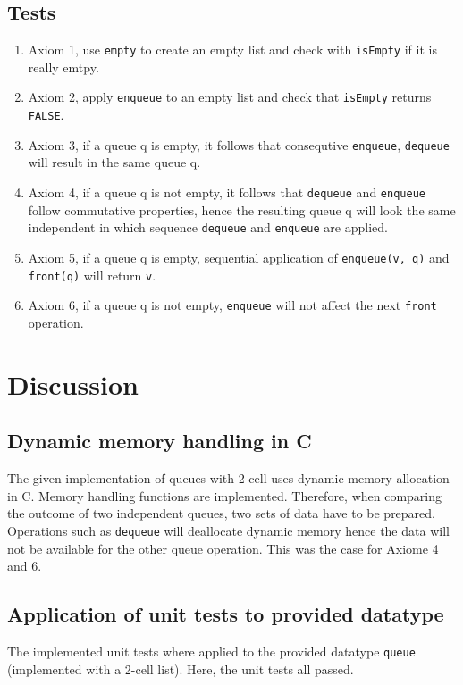 \documentclass[a4paper,11pt,twoside]{article}
\begin{document}
\subsection{Tests}
\begin{enumerate}
  \item Axiom 1, use \texttt{empty} to create an empty list and check
    with \texttt{isEmpty} if it is really emtpy. 
    \item Axiom 2, apply \texttt{enqueue} to an empty list and check
      that \texttt{isEmpty} returns \texttt{FALSE}.
      \item Axiom 3, if a queue q is empty, it follows that 
        consequtive \texttt{enqueue}, \texttt{dequeue} will result in
        the same queue q. 
        \item Axiom 4, if a queue q is not empty, it follows that
          \texttt{dequeue} and \texttt{enqueue} follow commutative
          properties, hence the resulting queue q will look the same
          independent in which sequence \texttt{dequeue} and 
          \texttt{enqueue} are applied.
          \item Axiom 5, if a queue q is empty, sequential
            application of \texttt{enqueue(v, q)} and
            \texttt{front(q)} will return \texttt{v}.
            \item Axiom 6, if a queue q is not empty,
              \texttt{enqueue} will not affect the next \texttt{front}
              operation. 
\end{enumerate}

\section{Discussion} 
\subsection{Dynamic memory handling in C}
The given implementation of queues with 2-cell uses dynamic memory
allocation in C. Memory handling functions are implemented. Therefore,
when comparing the outcome of two independent queues, two sets of data
have to be prepared. Operations such as \texttt{dequeue} will
deallocate dynamic memory hence the data will not be available for the
other queue operation. This was the case for Axiome 4 and 6.

\subsection{Application of unit tests to provided datatype}
The implemented unit tests where applied to the provided datatype
\texttt{queue} (implemented with a 2-cell list). Here, the unit tests 
all passed.
\end{document}
